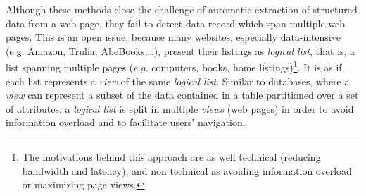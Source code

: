 Although these methods close the challenge of automatic extraction of structured data from a web page, they fail to detect data record which span multiple web pages. \color{black}This is an open issue, because many websites, especially data-intensive (e.g. Amazon, Trulia, AbeBooks,\ldots), present their listings as \emph{logical list}, that is, a list spanning multiple pages (\textit{e.g.} computers, books, home listings)\footnote{The motivations behind this approach are as well technical (reducing bandwidth and latency), and non technical as avoiding information overload or maximizing page views.}. It is as if, each list represents a \emph{view} of the same \emph{logical list}. Similar to databases, where a \emph{view} can represent a subset of the data contained in a table partitioned over a set of attributes, a \emph{logical list} is split in multiple \emph{views} (web pages) in order to avoid information overload and to facilitate users' navigation. 

